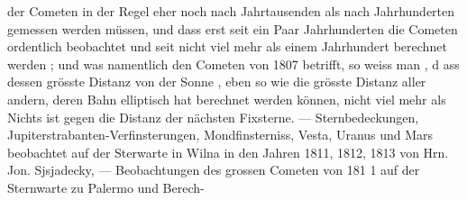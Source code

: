 \documentclass[12pt,a4paper]{article}
\begin{document}
der Cometen in der Regel eher noch nach Jahrtausenden als nach Jahrhunderten gemessen werden\newline
müssen, und dass erst seit ein Paar Jahrhunderten die Cometen ordentlich beobachtet und seit nicht\newline
viel mehr als einem Jahrhundert berechnet werden ; und was namentlich den Cometen von 1807 betrifft,\newline
so weiss man , d ass dessen grösste Distanz von der Sonne , eben so wie die grösste Distanz aller andern,\newline
deren Bahn elliptisch hat berechnet werden können, nicht viel mehr als Nichts ist gegen die Distanz\newline
der nächsten Fixsterne. --- Sternbedeckungen, Jupiterstrabanten-Verfinsterungen, Mondfinsterniss, Vesta,\newline
Uranus und Mars beobachtet auf der Sterwarte in Wilna in den Jahren 1811, 1812, 1813 von Hrn. Jon.\newline
Sjsjadecky, --- Beobachtungen des grossen Cometen von 181 1 auf der Sternwarte zu Palermo und Berech-\newline
\end{document}
